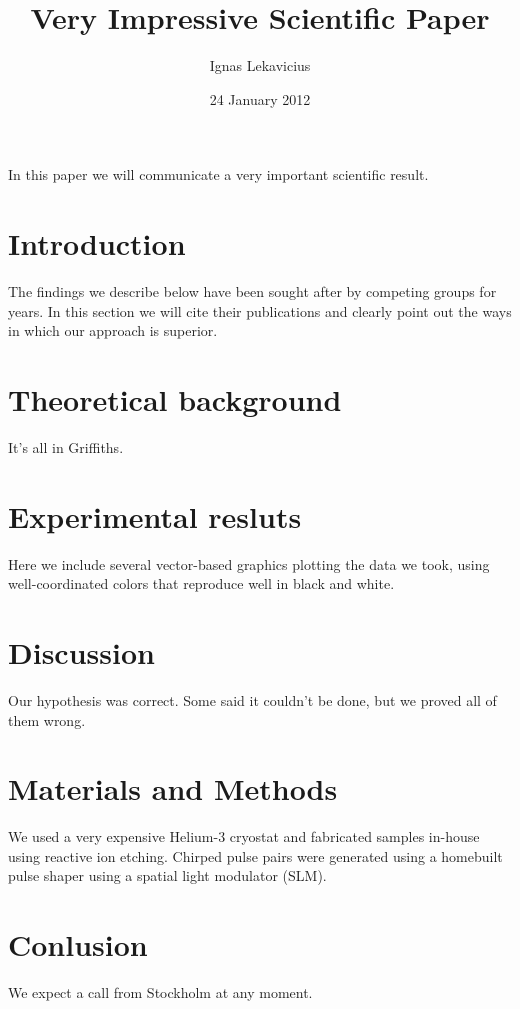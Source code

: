 \documentclass[11pt]{amsart}
\title{Very Impressive Scientific Paper}
\author{Ignas Lekavicius}
\date{24 January 2012}
\begin{document}
\maketitle

In this paper we will communicate a very important scientific result.

\section{Introduction}

The findings we describe below have been sought after by competing groups
 for years. In this section we will cite their publications and clearly
 point out the ways in which our approach is superior.

\section{Theoretical background}

It's all in Griffiths.

\section{Experimental resluts}

Here we include several vector-based graphics plotting the data we
 took, using well-coordinated colors that reproduce well in black and 
white.

\section{Discussion}

Our hypothesis was correct. Some said it couldn't be done, but we 
proved all of them wrong.

\section{Materials and Methods}

We used a very expensive Helium-3 cryostat and fabricated samples 
in-house using reactive ion etching. Chirped pulse pairs were
 generated using a homebuilt pulse shaper using a spatial light
 modulator (SLM).

\section{Conlusion}

We expect a call from Stockholm at any moment.
\end{document}
